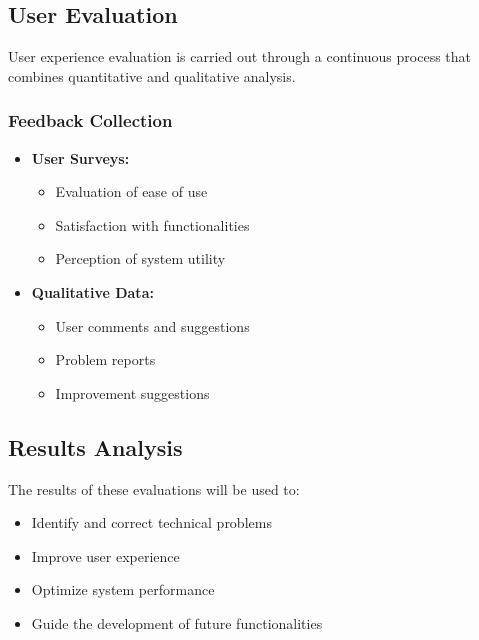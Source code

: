 \subsection{User Evaluation}
\label{evaluacion-usuario}

User experience evaluation is carried out through a continuous process that combines quantitative and qualitative analysis.

\subsubsection{Feedback Collection}

\begin{itemize}
	\item \textbf{User Surveys:}
	      \begin{itemize}
		      \item Evaluation of ease of use
		      \item Satisfaction with functionalities
		      \item Perception of system utility
	      \end{itemize}

	\item \textbf{Qualitative Data:}
	      \begin{itemize}
		      \item User comments and suggestions
		      \item Problem reports
		      \item Improvement suggestions
	      \end{itemize}
\end{itemize}

\subsection{Results Analysis}

The results of these evaluations will be used to:

\begin{itemize}
	\item Identify and correct technical problems
	\item Improve user experience
	\item Optimize system performance
	\item Guide the development of future functionalities
\end{itemize}